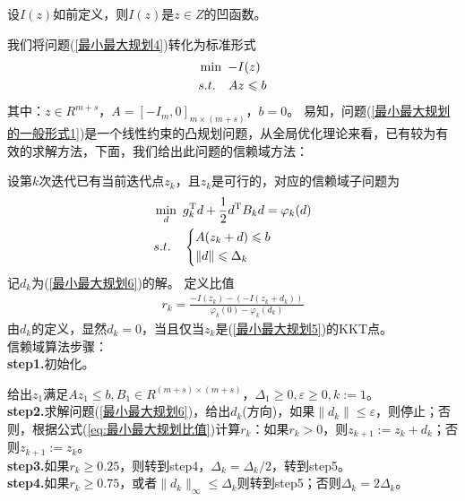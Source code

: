     \begin{theorem}
    设$I(z)$如前定义，则$I(z)$是$z\in Z$的凹函数。
    \end{theorem}
    \par
    我们将问题(\ref{最小最大规划4})转化为标准形式
        \begin{align}
        \label{最小最大规划5}
            &\mathop{\min}\ -I(z)\\
            &s.t.\quad Az \leqslant b \notag
            \end{align}
            其中：$z\in R^{m+s}$，$A=[-I_m,0]_{m\times (m+s)}$，$b=0$。
    易知，问题(\ref{最小最大规划的一般形式1})是一个线性约束的凸规划问题，从全局优化理论来看，已有较为有效的求解方法，下面，我们给出此问题的信赖域方法：
    \par
    设第$k$次迭代已有当前迭代点$z_k$，且$z_k$是可行的，对应的信赖域子问题为
    \begin{align}
    \label{最小最大规划6}
    &\mathop{\min}\limits_{d} \ g_k^\mathrm{T} d+\frac 12 d^\mathrm{T} B_kd={\varphi}_k(d)\\
    &s.t.\quad \left\{
    \begin{aligned}
    &A(z_k+d)\leqslant b\notag \\
    &\|d\|\leqslant {\Delta}_k \notag
    \end{aligned}
        \right.
    \end{align}
    记$d_k$为(\ref{最小最大规划6})的解。
    定义比值
    \begin{align}
    \label{eq:最小最大规划比值}
    r_k=\frac{-I(z_k)-(-I(z_k+d_k))}{{\varphi}_k(0)-{\varphi}_k(d_k)}
    \end{align}
    由$d_k$的定义，显然$d_k=0$，当且仅当$z_k$是(\ref{最小最大规划5})的KKT点。\\
    信赖域算法步骤：\\
    \textbf{step1.}初始化。
    \par
    给出$z_1$满足$Az_1\leqslant b,B_1\in R^{(m+s)\times (m+s)}$，${\Delta}_1\geqslant 0,\varepsilon \geqslant 0,k:=1$。\\
    \textbf{step2.}求解问题(\ref{最小最大规划6})，给出$d_k$(方向)，如果$\|d_k\|\leqslant \varepsilon$，则停止；否则，根据公式(\ref{eq:最小最大规划比值})计算$r_k$：如果$r_k>0$，则$z_{k+1}:=z_{k}+d_k$；否则$z_{k+1}:=z_{k}$。\\
    \textbf{step3.}如果$r_k\geqslant 0.25$，则转到step4，${\Delta}_k={\Delta}_k/2$，转到step5。\\
    \textbf{step4.}如果$r_k\geqslant 0.75$，或者$\|d_k\|_{\infty}\leqslant {\Delta}_k$则转到step5；否则${\Delta}_k=2{\Delta}_k$。\\
